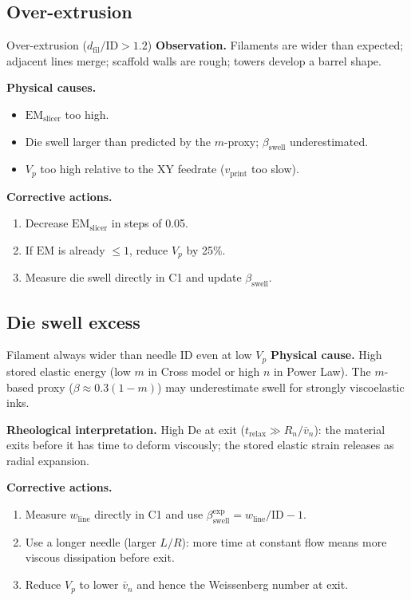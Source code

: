 \documentclass[11pt,a4paper]{article}
\newcommand{\De}{\mathrm{De}}
\begin{document}
\subsection{Over-extrusion}

\begin{failurebox}{Over-extrusion ($d_\mathrm{fil}/\mathrm{ID}>1.2$)}
\textbf{Observation.} Filaments are wider than expected; adjacent lines
merge; scaffold walls are rough; towers develop a barrel shape.

\textbf{Physical causes.}
\begin{itemize}[leftmargin=1.4em,itemsep=2pt]
\item $\mathrm{EM}_\mathrm{slicer}$ too high.
\item Die swell larger than predicted by the $m$-proxy; $\beta_\mathrm{swell}$
  underestimated.
\item $V_p$ too high relative to the XY feedrate ($v_\mathrm{print}$ too slow).
\end{itemize}

\textbf{Corrective actions.}
\begin{enumerate}[leftmargin=1.6em,itemsep=1pt]
\item Decrease $\mathrm{EM}_\mathrm{slicer}$ in steps of 0.05.
\item If $\mathrm{EM}$ is already $\leq 1$, reduce $V_p$ by 25\%.
\item Measure die swell directly in C1 and update $\beta_\mathrm{swell}$.
\end{enumerate}
\end{failurebox}

\subsection{Die swell excess}

\begin{failurebox}{Filament always wider than needle ID even at low $V_p$}
\textbf{Physical cause.} High stored elastic energy (low $m$ in Cross
model or high $n$ in Power Law). The $m$-based proxy
($\beta\approx 0.3(1-m)$) may underestimate swell for strongly
viscoelastic inks.

\textbf{Rheological interpretation.} High $\De$ at exit ($t_\mathrm{relax}
\gg R_n/\bar v_n$): the material exits before it has time to deform
viscously; the stored elastic strain releases as radial expansion.

\textbf{Corrective actions.}
\begin{enumerate}[leftmargin=1.6em,itemsep=1pt]
\item Measure $w_\mathrm{line}$ directly in C1 and use
  $\beta_\mathrm{swell}^\mathrm{exp}=w_\mathrm{line}/\mathrm{ID}-1$.
\item Use a longer needle (larger $L/R$): more time at constant flow
  means more viscous dissipation before exit.
\item Reduce $V_p$ to lower $\bar v_n$ and hence the Weissenberg number
  at exit.
\end{enumerate}
\end{failurebox}
\end{document}

